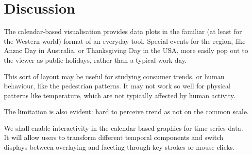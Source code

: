 \documentclass[article]{jss}
\begin{document}
\section{Discussion}\label{discussion}

The calendar-based visualisation provides data plots in the familiar (at
least for the Western world) format of an everyday tool. Special events
for the region, like Anzac Day in Australia, or Thanksgiving Day in the
USA, more easily pop out to the viewer as public holidays, rather than a
typical work day.

This sort of layout may be useful for studying consumer trends, or human
behaviour, like the pedestrian patterns. It may not work so well for
physical patterns like temperature, which are not typically affected by
human activity.

The limitation is also evident: hard to perceive trend as not on the
common scale.

We shall enable interactivity in the calendar-based graphics for time
series data. It will allow users to transform different temporal
components and switch displays between overlaying and faceting through
key strokes or mouse clicks.


\end{document}
